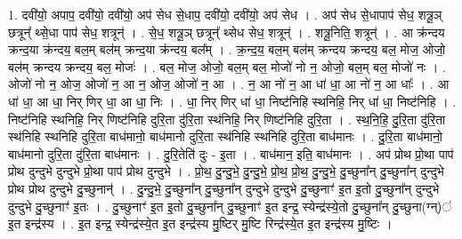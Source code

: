 \documentclass[17pt]{extarticle}
\begin{document}
1. दवी॑यो॒ अपाप॒ दवी॑यो॒ दवी॑यो॒ अप॑ सेध से॒धाप॒ दवी॑यो॒ दवी॑यो॒ अप॑ सेध । . अप॑ सेध से॒धापाप॑ सेध॒ शत्रू॒ञ् छत्रून्᳚ थ्से॒धा पाप॑ सेध॒ शत्रून्॑ । . से॒ध॒ शत्रू॒ञ् छत्रून्᳚ थ्सेध सेध॒ शत्रून्॑ । . शत्रू॒निति॒ शत्रून्॑ । . आ क्र॑न्दय क्रन्द॒या क्र॑न्दय॒ बल॒म् बल॑म् क्रन्द॒या क्र॑न्दय॒ बल᳚म् । . क्र॒न्द॒य॒ बल॒म् बल॑म् क्रन्दय क्रन्दय॒ बल॒ मोज॒ ओजो॒ बल॑म् क्रन्दय क्रन्दय॒ बल॒ मोजः॑ । . बल॒ मोज॒ ओजो॒ बल॒म् बल॒ मोजो॑ नो न॒ ओजो॒ बल॒म् बल॒ मोजो॑ नः । . ओजो॑ नो न॒ ओज॒ ओजो॑ न॒ आ न॒ ओज॒ ओजो॑ न॒ आ । . न॒ आ नो॑ न॒ आ धा॑ धा॒ आ नो॑ न॒ आ धाः᳚ । . आ धा॑ धा॒ आ धा॒ निर् णिर् धा॒ आ धा॒ निः । . धा॒ निर् णिर् धा॑ धा॒ निष्ट॑निहि स्थनिहि॒ निर् धा॑ धा॒ निष्ट॑निहि । . निष्ट॑निहि स्थनिहि॒ निर् णिष्ट॑निहि दुरि॒ता दु॑रि॒ता स्थ॑निहि॒ निर् णिष्ट॑निहि दुरि॒ता । . स्थ॒नि॒हि॒ दु॒रि॒ता दु॑रि॒ता स्थ॑निहि स्थनिहि दुरि॒ता बाध॑मानो॒ बाध॑मानो दुरि॒ता स्थ॑निहि स्थनिहि दुरि॒ता बाध॑मानः । . दु॒रि॒ता बाध॑मानो॒ बाध॑मानो दुरि॒ता दु॑रि॒ता बाध॑मानः । . दु॒रि॒तेति॑ दुः - इ॒ता । . बाध॑मान॒ इति॒ बाध॑मानः । . अप॑ प्रोथ प्रो॒था पाप॑ प्रोथ दुन्दुभे दुन्दुभे प्रो॒था पाप॑ प्रोथ दुन्दुभे । . प्रो॒थ॒ दु॒न्दु॒भे॒ दु॒न्दु॒भे॒ प्रो॒थ॒ प्रो॒थ॒ दु॒न्दु॒भे॒ दु॒च्छुना᳚न् दु॒च्छुना᳚न् दुन्दुभे प्रोथ प्रोथ दुन्दुभे दु॒च्छुनान्॑ । . दु॒न्दु॒भे॒ दु॒च्छुना᳚न् दु॒च्छुना᳚न् दुन्दुभे दुन्दुभे दु॒च्छुनाꣳ॑ इ॒त इ॒तो दु॒च्छुना᳚न् दुन्दुभे दुन्दुभे दु॒च्छुनाꣳ॑ इ॒तः । . दु॒च्छुनाꣳ॑ इ॒त इ॒तो दु॒च्छुना᳚न् दु॒च्छुनाꣳ॑ इ॒त इन्द्र॒ स्येन्द्र॑स्ये॒तो दु॒च्छुना᳚न् दु॒च्छुना(ग्न्)॑ इ॒त इन्द्र॑स्य । . इ॒त इन्द्र॒ स्येन्द्र॑स्ये॒त इ॒त इन्द्र॑स्य मु॒ष्टिर् मु॒ष्टि रिन्द्र॑स्ये॒त इ॒त इन्द्र॑स्य मु॒ष्टिः । \newline
\end{document}
